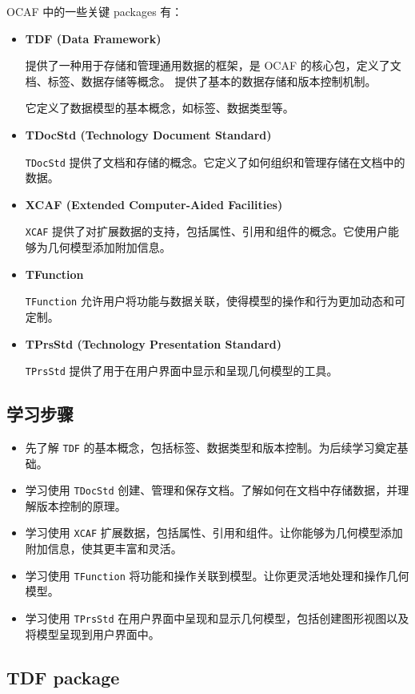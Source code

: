 \documentclass[11pt]{article}
\begin{document}
OCAF 中的一些关键 packages 有：

\begin{itemize}
\item \textbf{TDF (Data Framework)}

提供了一种用于存储和管理通用数据的框架，是 OCAF 的核心包，定义了文档、标签、数据存储等概念。
提供了基本的数据存储和版本控制机制。

它定义了数据模型的基本概念，如标签、数据类型等。

\item \textbf{TDocStd (Technology Document Standard)}

\texttt{TDocStd} 提供了文档和存储的概念。它定义了如何组织和管理存储在文档中的数据。

\item \textbf{XCAF (Extended Computer-Aided Facilities)}

\texttt{XCAF} 提供了对扩展数据的支持，包括属性、引用和组件的概念。它使用户能够为几何模型添加附加信息。

\item \textbf{TFunction}

\texttt{TFunction} 允许用户将功能与数据关联，使得模型的操作和行为更加动态和可定制。

\item \textbf{TPrsStd (Technology Presentation Standard)}

\texttt{TPrsStd} 提供了用于在用户界面中显示和呈现几何模型的工具。
\end{itemize}
\subsection{学习步骤}
\label{sec:orge041022}

\begin{itemize}
\item 先了解 \texttt{TDF} 的基本概念，包括标签、数据类型和版本控制。为后续学习奠定基础。
\item 学习使用 \texttt{TDocStd} 创建、管理和保存文档。了解如何在文档中存储数据，并理解版本控制的原理。
\item 学习使用 \texttt{XCAF} 扩展数据，包括属性、引用和组件。让你能够为几何模型添加附加信息，使其更丰富和灵活。
\item 学习使用 \texttt{TFunction} 将功能和操作关联到模型。让你更灵活地处理和操作几何模型。
\item 学习使用 \texttt{TPrsStd} 在用户界面中呈现和显示几何模型，包括创建图形视图以及将模型呈现到用户界面中。
\end{itemize}
\subsection{TDF package}
\label{sec:orgba450cb}
\end{document}
